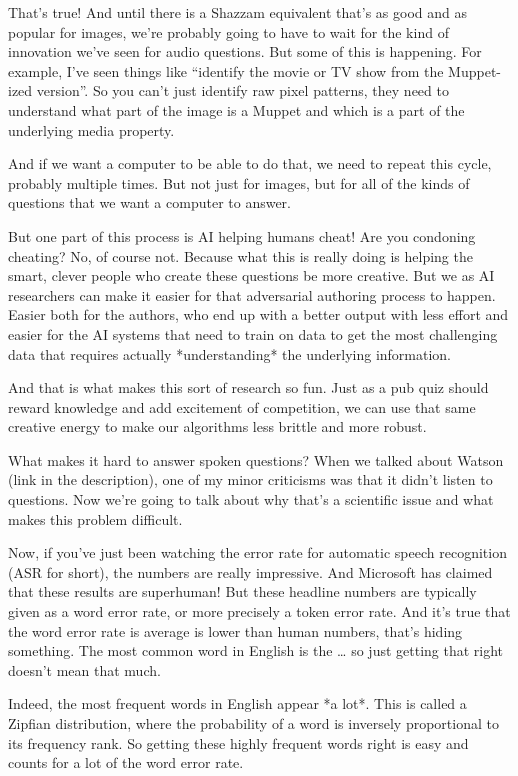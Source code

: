 That’s true!  And until there is a Shazzam equivalent that’s as good and as popular for images, we’re probably going to have to wait for the kind of innovation we’ve seen for audio questions.  But some of this is happening.  For example, I’ve seen things like “identify the movie or TV show from the Muppet-ized version”.  So you can’t just identify raw pixel patterns, they need to understand what part of the image is a Muppet and which is a part of the underlying media property.  

And if we want a computer to be able to do that, we need to repeat this cycle, probably multiple times.  But not just for images, but for all of the kinds of questions that we want a computer to answer.  

But one part of this process is AI helping humans cheat!  Are you condoning cheating?  No, of course not.  Because what this is really doing is helping the smart, clever people who create these questions be more creative.  But we as AI researchers can make it easier for that adversarial authoring process to happen.  Easier both for the authors, who end up with a better output with less effort and easier for the AI systems that need to train on data to get the most challenging data that requires actually *understanding* the underlying information.

And that is what makes this sort of research so fun.  Just as a pub quiz should reward knowledge and add excitement of competition, we can use that same creative energy to make our algorithms less brittle and more robust.  

What makes it hard to answer spoken questions?  
When we talked about Watson (link in the description), one of my minor criticisms was that it didn’t listen to questions.  Now we’re going to talk about why that’s a scientific issue and what makes this problem difficult.

Now, if you’ve just been watching the error rate for automatic speech recognition (ASR for short), the numbers are really impressive.  And Microsoft has claimed that these results are superhuman!  But these headline numbers are typically given as a word error rate, or more precisely a token error rate.  And it’s true that the word error rate is average is lower than human numbers, that’s hiding something.  The most common word in English is the … so just getting that right doesn’t mean that much.

Indeed, the most frequent words in English appear *a lot*.  This is called a Zipfian distribution, where the probability of a word is inversely proportional to its frequency rank.  So getting these highly frequent words right is easy and counts for a lot of the word error rate.  

